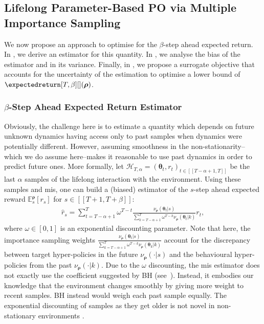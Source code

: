 \subsection{Lifelong Parameter-Based PO via Multiple Importance Sampling}
\label{subsec:mis_lifelong}

We now propose an approach to optimise for the $\beta$-step ahead expected return. 
In , we derive an estimator for this quantity.
In , we analyse the bias of the estimator and in  its variance.
Finally, in , we propose a surrogate objective that accounts for the uncertainty of the estimation to optimise a lower bound of $\expectedreturn[T,\beta][](\boldsymbol\rho)$.

\subsubsection{$\beta$-Step Ahead Expected Return Estimator}
\label{subsec:beta_step_estim}

Obviously, the challenge here is to estimate a quantity which depends on future unknown dynamics having access only to past samples when dynamics were potentially different. 
However, assuming smoothness in the non-stationarity--which we do assume here--makes it reasonable to use past dynamics in order to predict future ones. 
More formally, let $\mathcal{H}_{T,\alpha} = (\boldsymbol\theta_t,r_t)_{t \in [\![T-\alpha+1,T]\!]}$ be the last $\alpha$ samples of the lifelong interaction with the environment.
Using these samples and \gls{mis}, one can build a (biased) estimator of the $s$-step ahead expected reward $\mathbb{E}_s^{\boldsymbol\rho}[r_s]$ for $s \in [\![T+1,T+\beta]\!]$:
\begin{align*}
    \widehat{r}_{s} = \sum_{t=T-\alpha+1}^{T} \omega^{T-t} \frac{\nu_{\boldsymbol\rho}(\boldsymbol\theta_t\vert s)}{ \sum_{k=T-\alpha+1}^T \omega^{T-k} \nu_{\boldsymbol\rho}(\boldsymbol\theta_t\vert k)} r_{t},
\end{align*}
where $\omega \in [0,1]$ is an exponential discounting parameter.
Note that here, the importance sampling weights $\textstyle\frac{\nu_{\boldsymbol\rho}(\boldsymbol\theta_t\vert s)}{ \sum_{k=T-\alpha+1}^T \omega^{T-k} \nu_{\boldsymbol\rho}(\boldsymbol\theta_k\vert k)}$ account for the discrepancy between target hyper-policies in the future $\nu_{\boldsymbol\rho}(\cdot\vert s)$ and the behavioural hyper-policies from the past $\nu_{\boldsymbol\rho}(\cdot\vert k)$. 
Due to the $\omega$ discounting, the \gls{mis} estimator does not exactly use the coefficient suggested by BH (see~). 
Instead, it embodies our knowledge that the environment changes smoothly by giving more weight to recent samples. BH instead would weigh each past sample equally. 
The exponential discounting of samples as they get older is not novel in non-stationary environments \cite{jagerman2019people}.

